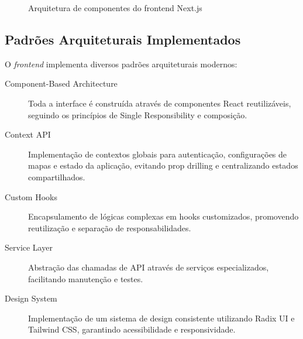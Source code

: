\begin{figure}[htbp]
\caption{Arquitetura de componentes do frontend Next.js}
\label{fig:arquitetura-frontend}
\end{figure}

\subsection{Padrões Arquiteturais Implementados}

O \textit{frontend} implementa diversos padrões arquiteturais modernos:

\begin{description}
    \item[Component-Based Architecture] Toda a interface é construída através de componentes React reutilizáveis, seguindo os princípios de Single Responsibility e composição.
    
    \item[Context API] Implementação de contextos globais para autenticação, configurações de mapas e estado da aplicação, evitando prop drilling e centralizando estados compartilhados.
    
    \item[Custom Hooks] Encapsulamento de lógicas complexas em hooks customizados, promovendo reutilização e separação de responsabilidades.
    
    \item[Service Layer] Abstração das chamadas de API através de serviços especializados, facilitando manutenção e testes.
    
    \item[Design System] Implementação de um sistema de design consistente utilizando Radix UI e Tailwind CSS, garantindo acessibilidade e responsividade.
\end{description}


